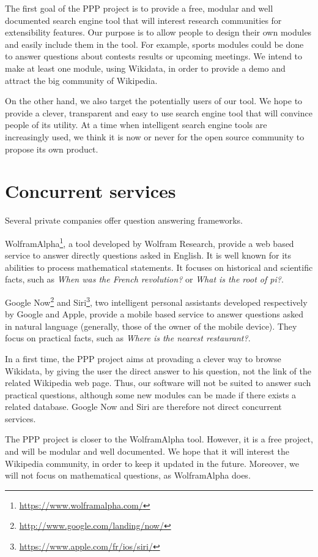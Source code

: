 \documentclass[a4paper,10pt]{article}
\begin{document}
The first goal of the PPP project is to provide a free, modular and well documented search engine tool that will 
interest research communities for extensibility features. Our purpose is to allow people to design their own modules and
easily include them in the tool. For example, sports modules could be done to answer questions about contests results or 
upcoming meetings. We intend to make at least one module, using Wikidata, in order to provide a demo and attract the big 
community of Wikipedia. 

On the other hand, we also target the potentially users of our tool. We hope to provide a clever, transparent and easy to use search 
engine tool that will convince people of its utility. At a time when intelligent search engine tools are increasingly used, we think it is
now or never for the open source community to propose its own product.

\section{Concurrent services}

Several private companies offer question answering frameworks. 

WolframAlpha\footnote{\url{https://www.wolframalpha.com/}}, a tool developed by 
Wolfram Research, provide a web based service to answer directly questions asked
in English. It is well known for its abilities to process mathematical statements.
It focuses on historical and scientific facts, such as \emph{When was the French 
revolution?} or \emph{What is the root of pi?}.

Google Now\footnote{\url{http://www.google.com/landing/now/}} and Siri\footnote{\url{https://www.apple.com/fr/ios/siri/}}, two intelligent personal assistants
developed respectively by Google and Apple, provide a mobile based service to 
answer questions asked in natural language (generally, those of the owner of the
mobile device). They focus on practical facts, such as \emph{Where is the nearest
restaurant?}.

In a first time, the PPP project aims at provading a clever way to browse Wikidata, by giving the 
user the direct answer to his question, not the link of the related Wikipedia
web page. Thus, our software will not be suited to answer such practical questions,
although some new modules can be made if there exists a related database. Google Now
and Siri are therefore not direct concurrent services.

The PPP project is closer to the WolframAlpha tool. However, it is a free project,
and will be modular and well documented. We hope that it will interest the 
Wikipedia community, in order to keep it updated in the future. Moreover,
we will not focus on mathematical questions, as WolframAlpha does.
\end{document}
